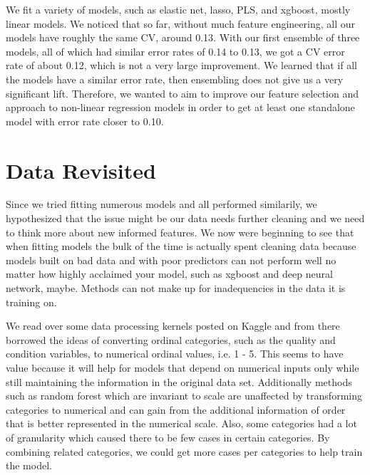 \documentclass[12pt]{article}
\begin{document}
We fit a variety of models, such as elastic net, lasso, PLS, and xgboost, mostly linear models.  We noticed that so far, without much feature engineering, all our models have roughly the same CV, around 0.13.  With our first ensemble of three models, all of which had similar error rates of 0.14 to 0.13, we got a CV error rate of about 0.12, which is not a very large improvement. We learned that if all the models have a similar error rate, then ensembling does not give us a very significant lift. Therefore, we wanted to aim to improve our feature selection and approach to non-linear regression models in order to get at least one standalone model with error rate closer to 0.10.

\section{Data Revisited}

Since we tried fitting numerous models and all performed similarily, we hypothesized that the issue might be our data needs further cleaning and we need to think more about new informed features. We now were beginning to see that when fitting models the bulk of the time is actually spent cleaning data because models built on bad data and with poor predictors can not perform well no matter how highly acclaimed your model, such as xgboost and deep neural network, maybe. Methods can not make up for inadequencies in the data it is training on.

We read over some data processing kernels posted on Kaggle and from there borrowed the ideas of converting ordinal categories, such as the quality and condition variables, to numerical ordinal values, i.e. 1 - 5. This seems to have value because it will help for models that depend on numerical inputs only while still maintaining the information in the original data set. Additionally methods such as random forest which are invariant to scale are unaffected by transforming categories to numerical and can gain from the additional information of order that is better represented in the numerical scale. Also, some categories had a lot of granularity which caused there to be few cases in certain categories.  By combining related categories, we could get more cases per categories to help train the model.  
\end{document}
